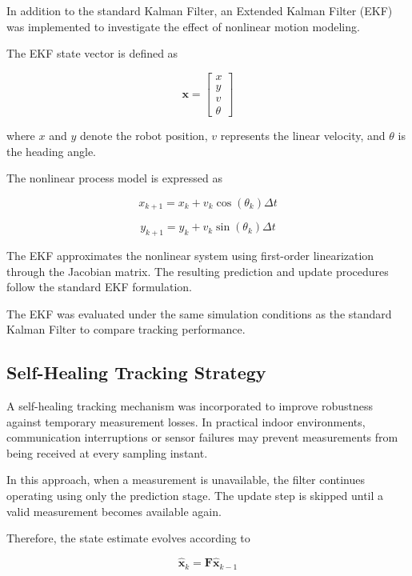 \documentclass[conference]{IEEEtran}
\begin{document}
In addition to the standard Kalman Filter, an Extended Kalman Filter (EKF) was implemented to investigate the effect of nonlinear motion modeling.

The EKF state vector is defined as

\begin{equation}
\mathbf{x}
=
\begin{bmatrix}
x\\
y\\
v\\
\theta
\end{bmatrix}
\end{equation}

where $x$ and $y$ denote the robot position, $v$ represents the linear velocity, and $\theta$ is the heading angle.

The nonlinear process model is expressed as

\begin{equation}
x_{k+1}
=
x_k
+
v_k \cos(\theta_k)\Delta t
\end{equation}

\begin{equation}
y_{k+1}
=
y_k
+
v_k \sin(\theta_k)\Delta t
\end{equation}

The EKF approximates the nonlinear system using first-order linearization through the Jacobian matrix. The resulting prediction and update procedures follow the standard EKF formulation.

The EKF was evaluated under the same simulation conditions as the standard Kalman Filter to compare tracking performance.

\subsection{Self-Healing Tracking Strategy}

A self-healing tracking mechanism was incorporated to improve robustness against temporary measurement losses. In practical indoor environments, communication interruptions or sensor failures may prevent measurements from being received at every sampling instant.

In this approach, when a measurement is unavailable, the filter continues operating using only the prediction stage. The update step is skipped until a valid measurement becomes available again.

Therefore, the state estimate evolves according to

\begin{equation}
\hat{\mathbf{x}}_k
=
\mathbf{F}
\hat{\mathbf{x}}_{k-1}
\end{equation}
\end{document}
